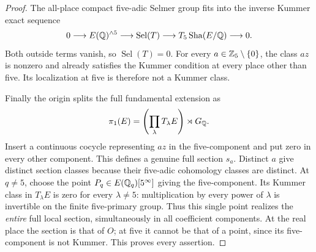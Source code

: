 \begin{proof}
The all-place compact five-adic Selmer group fits into the inverse
Kummer exact sequence
\[
 0\longrightarrow E(\mathbb Q)^{\wedge5}
 \longrightarrow \operatorname{Sel}(T)
 \longrightarrow T_5\mathop{\mathrm{Sha}}(E/\mathbb Q)\longrightarrow0.
\]
Both outside terms vanish, so $\operatorname{Sel}(T)=0$.
For every $a\in\mathbb Z_5\setminus\{0\}$, the class $az$ is nonzero and
already satisfies the Kummer condition at every place other than five.
Its localization at five is therefore not a Kummer class.

Finally the origin splits the full fundamental extension as
\[
 \pi_1(E)=\left(\prod_\lambda T_\lambda E\right)\rtimes G_\mathbb Q.
\]
Insert a continuous cocycle representing $az$ in the five-component
and put zero in every other component. This defines a genuine full
section $s_a$. Distinct $a$ give distinct section classes because their
five-adic cohomology classes are distinct. At $q\ne5$, choose the
point $P_q\in E(\mathbb Q_q)[5^\infty]$ giving the five-component. Its
Kummer class in $T_\lambda E$ is zero for every $\lambda\ne5$:
multiplication by every power of $\lambda$ is invertible on the finite
five-primary group. Thus this single point realizes the \emph{entire}
full local section, simultaneously in all coefficient components.
At the real place the section is that of $O$; at five it cannot be
that of a point, since its five-component is not Kummer.
This proves every assertion.
\end{proof}
